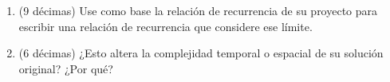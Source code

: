 
\begin{enumerate}
  \item (9 décimas) Use como base la relación de recurrencia de su proyecto para escribir una relación de recurrencia que considere ese límite.
  \item (6 décimas) ¿Esto altera la complejidad temporal o espacial de su solución original? ¿Por qué?
\end{enumerate}

\bigskip
